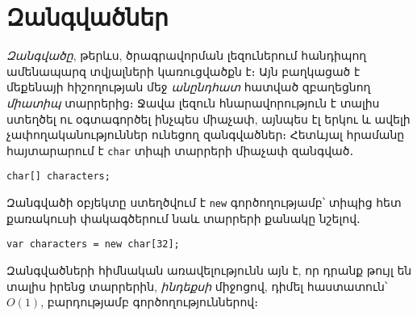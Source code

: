 \chapter{Զանգվածներ}

\emph{Զանգվածը}, թերևս, ծրագրավորման լեզուներում հանդիպող ամենապարզ
տվյալների կառուցվածքն է։ Այն բաղկացած է մեքենայի հիշողության մեջ
\emph{անընդհատ} հատված զբաղեցնող \emph{միատիպ} տարրերից։ Ջավա լեզուն
հնարավորություն է տալիս ստեղծել ու օգտագործել ինչպես միաչափ, այնպես
էլ երկու և ավելի չափողականություններ ունեցող զանգվածներ։ Հետևյալ
հրամանը հայտարարում է \texttt{char} տիպի տարրերի միաչափ զանգված․

\begin{verbatim}
char[] characters;
\end{verbatim}

Զանգվածի օբյեկտը ստեղծվում է \texttt{new} գործողությամբ՝ տիպից հետ
քառակուսի փակագծերում նաև տարրերի քանակը նշելով․

\begin{verbatim}
var characters = new char[32];
\end{verbatim}


Զանգվածների հիմնական առավելությունն այն է, որ դրանք թույլ են տալիս իրենց տարրերին, \emph{ինդեքսի} միջոցով, դիմել հաստատուն՝ \(O(1)\), բարդությամբ գործողություններով։



